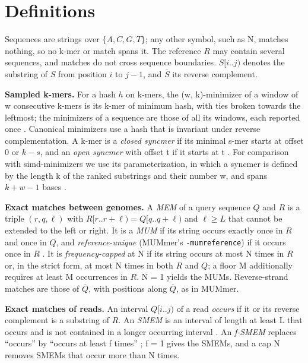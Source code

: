 \section{Definitions}

Sequences are strings over \(\{A, C, G, T\}\); any other symbol, such as N, matches nothing, so no k-mer or match spans it. The reference \(R\) may contain several sequences, and matches do not cross sequence boundaries. \(S[i..j)\) denotes the substring of \(S\) from position \(i\) to \(j - 1\), and \(\overline{S}\) its reverse complement.

\textbf{Sampled k-mers.} For a hash \(h\) on k-mers, the (w, k)-minimizer of a window of w consecutive k-mers is its k-mer of minimum hash, with ties broken towards the leftmost; the minimizers of a sequence are those of all its windows, each reported once \citep{Roberts2004}. Canonical minimizers use a hash that is invariant under reverse complementation. A k-mer is a \emph{closed syncmer} if its minimal s-mer starts at offset 0 or \(k - s\), and an \emph{open syncmer} with offset t if it starts at t \citep{Edgar2021}. For comparison with simd-minimizers we use its parameterization, in which a syncmer is defined by the length k of the ranked substrings and their number w, and spans \(k + w - 1\) bases \citep{GrootKoerkamp2025simd}.

\textbf{Exact matches between genomes.} A \emph{MEM} of a query sequence \(Q\) and \(R\) is a triple \((r, q, \ell)\) with \(R[r..r+\ell) = Q[q..q+\ell)\) and \(\ell \ge L\) that cannot be extended to the left or right. It is a \emph{MUM} if its string occurs exactly once in \(R\) and once in \(Q\), and \emph{reference-unique} (MUMmer's \texttt{-mumreference}) if it occurs once in \(R\) \citep{Kurtz2004}. It is \emph{frequency-capped} at N if its string occurs at most N times in \(R\) or, in the strict form, at most N times in both \(R\) and \(Q\); a floor M additionally requires at least M occurrences in \(R\). N = 1 yields the MUMs. Reverse-strand matches are those of \(\overline{Q}\), with positions along \(\overline{Q}\), as in MUMmer.

\textbf{Exact matches of reads.} An interval \(Q[i..j)\) of a read \emph{occurs} if it or its reverse complement is a substring of \(R\). An \emph{SMEM} is an interval of length at least L that occurs and is not contained in a longer occurring interval \citep{Li2012}. An \emph{f-SMEM} replaces ``occurs'' by ``occurs at least f times'' \citep{Tatarnikov2022,Gagie2026}; f = 1 gives the SMEMs, and a cap N removes SMEMs that occur more than N times.
